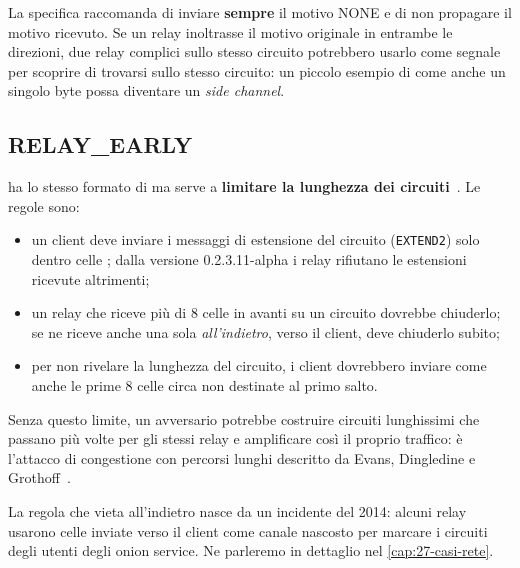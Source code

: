 \begin{attenzione}
La specifica raccomanda di inviare \textbf{sempre} il motivo NONE e di non propagare il motivo ricevuto. Se un relay inoltrasse il motivo originale in entrambe le direzioni, due relay complici sullo stesso circuito potrebbero usarlo come segnale per scoprire di trovarsi sullo stesso circuito: un piccolo esempio di come anche un singolo byte possa diventare un \emph{side channel}.
\end{attenzione}

\subsection{RELAY\_EARLY}

 ha lo stesso formato di  ma serve a \textbf{limitare la lunghezza dei circuiti}~. Le regole sono:
\begin{itemize}
  \item un client deve inviare i messaggi di estensione del circuito (\texttt{EXTEND2}) solo dentro celle ; dalla versione 0.2.3.11-alpha i relay rifiutano le estensioni ricevute altrimenti;
  \item un relay che riceve più di 8 celle  in avanti su un circuito dovrebbe chiuderlo; se ne riceve anche una sola \emph{all'indietro}, verso il client, deve chiuderlo subito;
  \item per non rivelare la lunghezza del circuito, i client dovrebbero inviare come  anche le prime 8 celle circa non destinate al primo salto.
\end{itemize}
Senza questo limite, un avversario potrebbe costruire circuiti lunghissimi che passano più volte per gli stessi relay e amplificare così il proprio traffico: è l'attacco di congestione con percorsi lunghi descritto da Evans, Dingledine e Grothoff~\cite{evans2009congestion}.

\begin{storia}
La regola che vieta  all'indietro nasce da un incidente del 2014: alcuni relay usarono celle  inviate verso il client come canale nascosto per marcare i circuiti degli utenti degli onion service. Ne parleremo in dettaglio nel \cref{cap:27-casi-rete}.
\end{storia}

